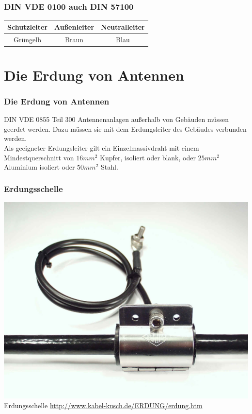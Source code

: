 \begin{frame}
  \frametitle{DIN VDE 0100 auch DIN 57100}
  \begin{center} \large
    \begin{tabular}{c|c|c}
      Schutzleiter & Außenleiter & Neutralleiter \\ \hline \hline
      Grüngelb & Braun & Blau \\
    \end{tabular}
  \end{center}
\end{frame}

\section*{Die Erdung von Antennen}

\begin{frame}
  \frametitle{Die Erdung von Antennen}
  \begin{center}
    \begin{block}{DIN VDE 0855 Teil 300}
      Antennenanlagen außerhalb von Gebäuden müssen geerdet werden. Dazu müssen sie mit dem Erdungsleiter des Gebäudes verbunden werden. \\
      Als geeigneter Erdungsleiter gilt ein Einzelmassivdraht mit einem Mindestquerschnitt von $16 mm^2$ Kupfer, isoliert oder blank, oder $25 mm^2$ Aluminium isoliert oder $50 mm^2$ Stahl.
    \end{block}
  \end{center}
\end{frame}

\begin{frame}
  \frametitle{Erdungsschelle}
  \begin{center}
    \includegraphics[width=\textwidth,height=0.8\textheight,keepaspectratio]{a19/AntenneErden.jpg}\\
    \tiny Erdungsschelle \url{http://www.kabel-kusch.de/ERDUNG/erdung.htm} \\[1em]
  \end{center}
\end{frame}

